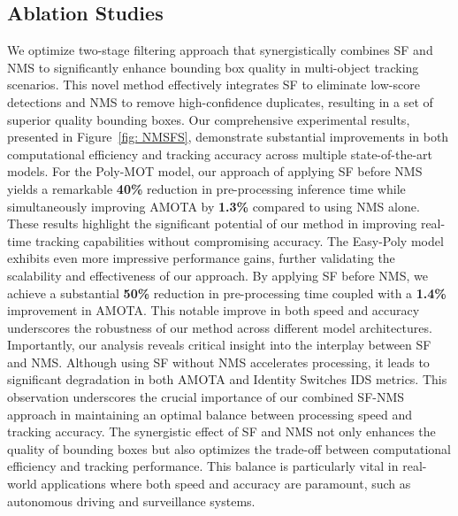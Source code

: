\subsection{Ablation Studies}


We optimize two-stage filtering approach that synergistically combines SF and NMS to significantly enhance bounding box quality in multi-object tracking scenarios. This novel method effectively integrates SF to eliminate low-score detections and NMS to remove high-confidence duplicates, resulting in a set of superior quality bounding boxes. Our comprehensive experimental results, presented in Figure~\ref{fig: NMSFS}, demonstrate substantial improvements in both computational efficiency and tracking accuracy across multiple state-of-the-art models. For the Poly-MOT model, our approach of applying SF before NMS yields a remarkable \textbf{40\%} reduction in pre-processing inference time while simultaneously improving AMOTA by \textbf{1.3\%} compared to using NMS alone. These results highlight the significant potential of our method in improving real-time tracking capabilities without compromising accuracy. The Easy-Poly model exhibits even more impressive performance gains, further validating the scalability and effectiveness of our approach. By applying SF before NMS, we achieve a substantial \textbf{50\%} reduction in pre-processing time coupled with a \textbf{1.4\%} improvement in AMOTA. This notable improve in both speed and accuracy underscores the robustness of our method across different model architectures. Importantly, our analysis reveals critical insight into the interplay between SF and NMS. Although using SF without NMS accelerates processing, it leads to significant degradation in both AMOTA and Identity Switches IDS metrics. This observation underscores the crucial importance of our combined SF-NMS approach in maintaining an optimal balance between processing speed and tracking accuracy. The synergistic effect of SF and NMS not only enhances the quality of bounding boxes but also optimizes the trade-off between computational efficiency and tracking performance. This balance is particularly vital in real-world applications where both speed and accuracy are paramount, such as autonomous driving and surveillance systems. 


